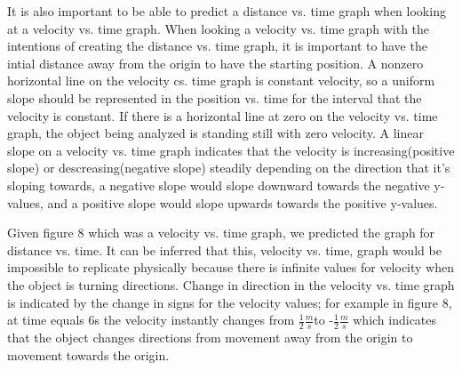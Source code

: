 \documentclass[aps,letterpaper,11pt]{revtex4}
\begin{document}
It is also important to be able to predict a distance vs. time graph when looking at a velocity vs. time graph. When looking a velocity vs. time graph with the intentions of creating the distance vs. time graph, it is important to have the intial distance away from the origin to have the starting position. A nonzero horizontal line on the velocity cs. time graph is constant velocity, so a uniform slope should be represented in the position vs. time for the interval that the velocity is constant. If there is a horizontal line at zero on the velocity vs. time graph, the object being analyzed is standing still with zero velocity. A linear slope on a velocity vs. time graph indicates that the velocity is increasing(positive slope) or descreasing(negative slope) steadily depending on the direction that it's sloping towards, a negative slope would slope downward towards the negative y-values, and a positive slope would slope upwards towards the positive y-values. 

Given figure 8 which was a velocity vs. time graph, we predicted the graph for distance vs. time. It can be inferred that this, velocity vs. time, graph would be impossible to replicate physically because there is infinite values for velocity when the object is turning directions. Change in direction in the velocity vs. time graph is indicated by the change in signs for the velocity values; for example in figure 8, at time equals 6s the velocity instantly changes from $\frac{1}{2}\frac{m}{s}$to -$\frac{1}{2}\frac{m}{s}$ which indicates that the object changes directions from movement away from the origin to movement towards the origin.
\end{document}
